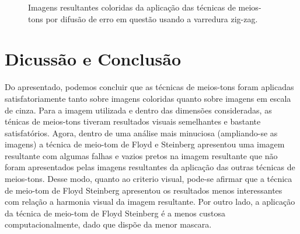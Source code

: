 \documentclass{article}
\begin{document}
\begin{figure}[!htp]
	\qquad
	\quad
	
	\caption{Imagens resultantes coloridas da aplicação das técnicas de meios-tons por difusão de erro em questão usando a varredura zig-zag.}%
	\label{fig:imagem:planocolorido:2}%
\end{figure}

\section{Dicussão e Conclusão}
Do apresentado, podemos concluir que as técnicas de meios-tons foram aplicadas satisfatoriamente tanto sobre imagens coloridas quanto sobre imagens em escala de cinza. Para a imagem utilizada e dentro das dimensões consideradas, as ténicas de meios-tons tiveram resultados visuais semelhantes e bastante satisfatórios. Agora, dentro de uma análise mais minuciosa (ampliando-se as imagens) a técnica de meio-tom de Floyd e Steinberg apresentou uma imagem resultante com algumas falhas e vazios pretos na imagem resultante que não foram apresentados pelas imagens resultantes da aplicação das outras técnicas de meios-tons. Desse modo, quanto ao criterio visual, pode-se afirmar que a técnica de meio-tom de Floyd Steinberg apresentou os resultados menos interessantes com relação a harmonia visual da imagem resultante. Por outro lado, a aplicação da técnica de meio-tom de Floyd Steinberg é a menos custosa computacionalmente, dado que dispõe da menor mascara.
\end{document}
